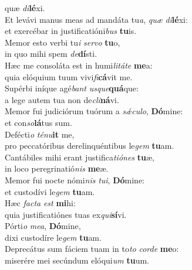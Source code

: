 \oddverse quæ \textit{di}\textbf{lé}xi.\\
\evenverse Et levávi manus meas ad mandáta tu\textit{a}, \textit{quæ} \textit{di}\textbf{lé}xi:~\*\\
\evenverse et exercébar in justificatióni\textit{bus} \textbf{tu}is.\\
\oddverse Memor esto verbi tu\textit{i} \textit{ser}\textit{vo} \textbf{tu}o,~\*\\
\oddverse in quo mihi spem \textit{de}\textbf{dí}sti.\\
\evenverse Hæc me consoláta est in humi\textit{li}\textit{tá}\textit{te} \textbf{me}a:~\*\\
\evenverse quia elóquium tuum vivi\textit{fi}\textbf{cá}vit me.\\
\oddverse Supérbi iníque agé\textit{bant} \textit{us}\textit{que}\textbf{quá}que:~\*\\
\oddverse a lege autem tua non de\textit{cli}\textbf{ná}vi.\\
\evenverse Memor fui judiciórum tuórum a \textit{sǽ}\textit{cu}\textit{lo}, \textbf{Dó}mine:~\*\\
\evenverse et con\textit{so}\textbf{lá}tus sum.\\
\oddverse Defécti\textit{o} \textit{té}\textit{nu}\textbf{it} me,~\*\\
\oddverse pro peccatóribus derelinquéntibus le\textit{gem} \textbf{tu}am.\\
\evenverse Cantábiles mihi erant justifica\textit{ti}\textit{ó}\textit{nes} \textbf{tu}æ,~\*\\
\evenverse in loco peregrinatió\textit{nis} \textbf{me}æ.\\
\oddverse Memor fui nocte nómi\textit{nis} \textit{tu}\textit{i}, \textbf{Dó}mine:~\*\\
\oddverse et custodívi le\textit{gem} \textbf{tu}am.\\
\evenverse Hæc \textit{fa}\textit{cta} \textit{est} \textbf{mi}hi:~\*\\
\evenverse quia justificatiónes tuas ex\textit{qui}\textbf{sí}vi.\\
\oddverse Pórti\textit{o} \textit{me}\textit{a}, \textbf{Dó}mine,~\*\\
\oddverse dixi custodíre le\textit{gem} \textbf{tu}am.\\
\evenverse Deprecátus sum fáciem tuam in to\textit{to} \textit{cor}\textit{de} \textbf{me}o:~\*\\
\evenverse miserére mei secúndum elóqui\textit{um} \textbf{tu}um.\\
